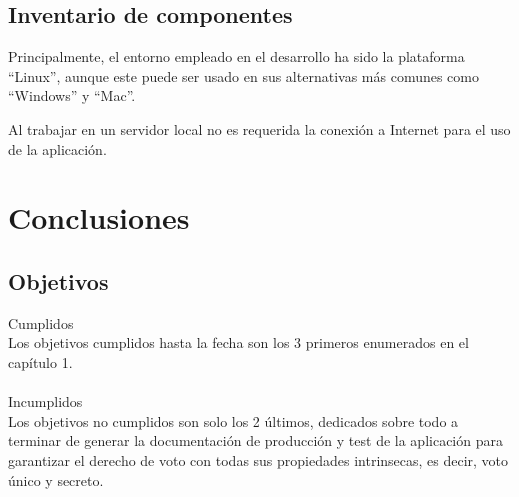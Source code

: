 \documentclass[12pt,letterpaper]{report}
\begin{document}
	\subsection{Inventario de componentes}
	Principalmente, el entorno empleado en el desarrollo ha sido la plataforma “Linux”, aunque este puede ser usado en sus alternativas más comunes como “Windows” y “Mac”. 

Al trabajar en un servidor local no es requerida la conexión a Internet para el uso de la aplicación. 

\section{Conclusiones}
	\subsection{Objetivos}
		\noindent Cumplidos\\
		Los objetivos cumplidos hasta la fecha son los 3 primeros enumerados en el capítulo 1.
		\\~\\
		\noindent Incumplidos\\
		Los objetivos no cumplidos son solo los 2 últimos, dedicados sobre todo a terminar de generar la
		documentación de producción y test de la aplicación para garantizar el derecho de voto con todas
		sus propiedades intrinsecas, es decir, voto único y secreto.
\end{document}
